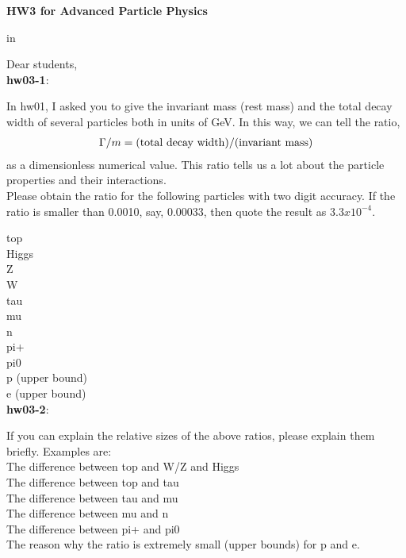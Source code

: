 \documentclass[12pt]{article}
\begin{document}
\begin{center}
{\large\bf HW3 for Advanced Particle Physics} \\

\end{center}

 in

Dear students, \\

{\bf hw03-1}:

  In hw01, I asked you to give the invariant mass (rest mass)
  and the total decay width of several particles both in
  units of GeV.  In this way, we can tell the ratio,
  \begin{eqnarray}
    \Gamma/m = ({\rm total~decay~width})/({\rm invariant~ mass})
  \end{eqnarray}  
  as a dimensionless numerical value.  This ratio tells us a lot
  about the particle properties and their interactions.\\

  Please obtain the ratio for the following particles
  with two digit accuracy.  If the ratio is smaller
  than 0.0010, say, 0.00033, then quote the result as
  $3.3 x 10^{-4}$.
 
  top\\
  Higgs\\
  Z\\
  W\\
  tau\\ 
  mu\\
  n\\
  pi+\\
  pi0\\
  p (upper bound)\\
  e (upper bound)\\

{\bf hw03-2}:

  If you can explain the relative sizes of the above
  ratios, please explain them briefly.  Examples are:\\

  The difference between top and W/Z and Higgs\\
  The difference between top and tau\\
  The difference between tau and mu\\
  The difference between mu  and n\\
  The difference between pi+ and pi0\\
  The reason why the ratio is extremely small (upper
  bounds) for p and e.\\
\end{document}
